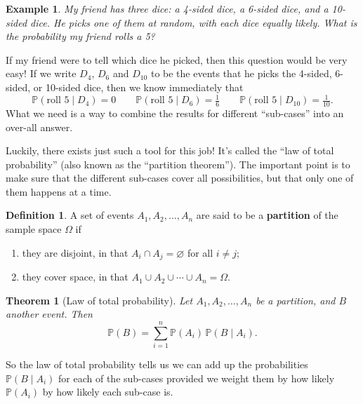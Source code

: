 \documentclass[
  a4paper,
]{book}
\providecommand{\tightlist}{%
  \setlength{\itemsep}{0pt}\setlength{\parskip}{0pt}}
\newtheorem{theorem}{Theorem}[chapter]
\theoremstyle{definition}
\newtheorem{definition}{Definition}[chapter]
\theoremstyle{definition}
\newtheorem{example}{Example}[chapter]
\theoremstyle{definition}
\theoremstyle{definition}
\theoremstyle{remark}
\begin{document}
\begin{example}
\protect\hypertarget{exm:dice-total}{}\label{exm:dice-total}\emph{My friend has three dice: a 4-sided dice, a 6-sided dice, and a 10-sided dice. He picks one of them at random, with each dice equally likely. What is the probability my friend rolls a 5?}

If my friend were to tell which dice he picked, then this question would be very easy! If we write \(D_4\), \(D_6\) and \(D_{10}\) to be the events that he picks the 4-sided, 6-sided, or 10-sided dice, then we know immediately that
\[ \mathbb P(\text{roll 5} \mid D_4) = 0 \qquad \mathbb P(\text{roll 5} \mid D_6) = \tfrac16 \qquad \mathbb P(\text{roll 5} \mid D_{10}) = \tfrac{1}{10} .  \]
What we need is a way to combine the results for different ``sub-cases'' into an over-all answer.
\end{example}

Luckily, there exists just such a tool for this job! It's called the ``law of total probability'' (also known as the ``partition theorem''). The important point is to make sure that the different sub-cases cover all possibilities, but that only one of them happens at a time.

\begin{definition}

A set of events \(A_1, A_2, \dots, A_n\) are said to be a \textbf{partition} of the sample space \(\Omega\) if

\begin{enumerate}
\def\labelenumi{\arabic{enumi}.}
\tightlist
\item
  they are disjoint, in that \(A_i \cap A_j = \varnothing\) for all \(i \neq j\);
\item
  they cover space, in that \(A_1 \cup A_2 \cup \cdots \cup A_n = \Omega\).
\end{enumerate}

\end{definition}

\begin{theorem}[Law of total probability]
\protect\hypertarget{thm:thlawtotal}{}\label{thm:thlawtotal}Let \(A_1, A_2, \dots, A_n\) be a partition, and \(B\) another event. Then
\[ \mathbb P(B) = \sum_{i=1}^n \mathbb P(A_i) \, \mathbb P(B \mid A_i) . \]
\end{theorem}

So the law of total probability tells us we can add up the probabilities \(\mathbb P(B \mid A_i)\) for each of the sub-cases provided we weight them by how likely \(\mathbb P(A_i)\) by how likely each sub-case is.
\end{document}
